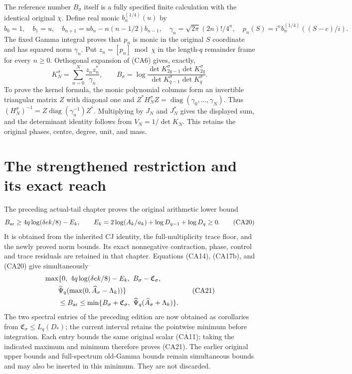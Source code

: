 The reference number $B_\sigma$ itself is a fully specified finite
calculation with the identical original $\chi$.  Define real monic
$b_n^{(1/4)}(u)$ by
\[
 b_0=1,\quad b_1=u,\quad
 b_{n+1}=ub_n-n(n-1/2)b_{n-1},\quad
 \gamma_n=\sqrt{2\pi}(2n)!/4^n,
 \quad p_n(S)=i^n b_n^{(1/4)}((S-c)/i).
 \tag{CA18}
\]
The fixed Gamma integral proves that $p_n$ is monic in the original
$S$ coordinate and has squared norm $\gamma_n$.  Put $z_n=[p_n]\bmod\chi$
in the length-$q$ remainder frame for every $n\ge0$.
Orthogonal expansion of (CA6) gives, exactly,
\[
 K_N^\sigma=\sum_{n=0}^N\frac{z_nz_n^*}{\gamma_n},\qquad
 B_\sigma=\log\frac{\det K_{2q-1}^\sigma\det K_{2q}^\sigma}
 {\det K_{q-1}^\sigma\det K_q^\sigma}.
 \tag{CA19}
\]
To prove the kernel formula, the monic polynomial columns form an
invertible triangular matrix $Z$ with diagonal one and
$Z^*H_N^\sigma Z=\operatorname{diag}(\gamma_0,\ldots,\gamma_N)$.
Thus $(H_N^\sigma)^{-1}=Z\operatorname{diag}(\gamma_n^{-1})Z^*$.
Multiplying by $J_N$ and $J_N^*$ gives the displayed sum, and the
determinant identity follows from $V_N=1/\det K_N$.
This retains the original phases, centre, degree, unit, and mass.

\section{The strengthened restriction and its exact reach}

The preceding actual-tail chapter proves the original arithmetic lower
bound
\[
 B_{\rm ar}\ge4q\log(\delta e k/8)-E_k,\qquad
 E_k=2\log(A_k/a_k)+\log D_{q-1}+\log D_q\ge0.
 \tag{CA20}
\]
It is obtained from the inherited CJ identity, the full-multiplicity
trace floor, and the newly proved norm bounds.  Its exact nonnegative
contraction, phase, control and trace residuals are retained in that
chapter.  Equations (CA14), (CA17b), and (CA20) give simultaneously
\[
 \begin{aligned}
 &\max\{0,\ 4q\log(\delta e k/8)-E_k,\ B_\sigma-\mathfrak C_\sigma,\\
 &\qquad\widehat\Psi_q(\max(0,\widehat A_\sigma-\Lambda_k))\}
 \\&\qquad\le B_{\rm ar}\le
 \min\{B_\sigma+\mathfrak C_\sigma,\ \widehat\Psi_q(\widehat A_\sigma+\Lambda_k)\}.
 \end{aligned}
 \tag{CA21}
\]
The two spectral entries of the preceding edition are now obtained
as corollaries from $\mathfrak C_\sigma\le L_q(D_*)$; the current
interval retains the pointwise minimum before integration. Each
entry bounds the same original scalar (CA11); taking the indicated
maximum and minimum therefore proves (CA21).  The earlier original
upper bounds and full-spectrum old-Gamma bounds remain simultaneous
bounds and may also be inserted in this minimum.  They are not discarded.

